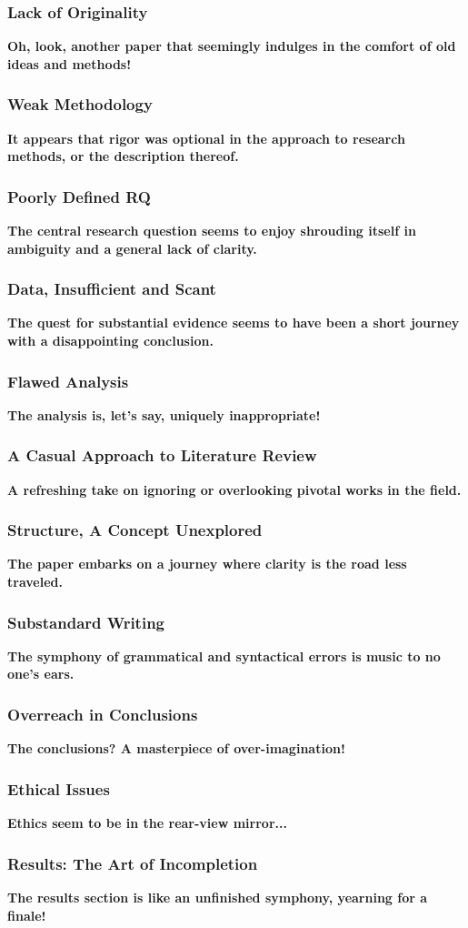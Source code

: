 \documentclass[handout]{beamer}
\begin{document}
\begin{frame}[plain]
\centering
\frametitle{Lack of Originality}
\Large\textbf{Oh, look, another paper that seemingly indulges in the comfort of old ideas and methods!}
\end{frame}
\begin{frame}[plain]
\centering
\frametitle{Weak Methodology}
\Large\textbf{It appears that rigor was optional in the approach to research methods, or the description thereof.}
\end{frame}
\begin{frame}[plain]
\centering
\frametitle{Poorly Defined RQ}
\Large\textbf{The central research question seems to enjoy shrouding itself in ambiguity and a general lack of clarity.}
\end{frame}
\begin{frame}[plain]
\centering
\frametitle{Data, Insufficient and Scant}
\Large\textbf{The quest for substantial evidence seems to have been a short journey with a disappointing conclusion.}
\end{frame}
\begin{frame}[plain]
\centering
\frametitle{Flawed Analysis}
\Large\textbf{The analysis is, let's say, uniquely inappropriate!}
\end{frame}
\begin{frame}[plain]
\centering
\frametitle{A Casual Approach to Literature Review}
\Large\textbf{A refreshing take on ignoring or overlooking pivotal works in the field.}
\end{frame}
\begin{frame}[plain]
\centering
\frametitle{Structure, A Concept Unexplored}
\Large\textbf{The paper embarks on a journey where clarity is the road less traveled.}
\end{frame}
\begin{frame}[plain]
\centering
\frametitle{Substandard Writing}
\Large\textbf{The symphony of grammatical and syntactical errors is music to no one's ears.}
\end{frame}
\begin{frame}[plain]
\centering
\frametitle{Overreach in Conclusions}
\Large\textbf{The conclusions? A masterpiece of over-imagination!}
\end{frame}
\begin{frame}[plain]
\centering
\frametitle{Ethical Issues}
\Large\textbf{Ethics seem to be in the rear-view mirror...}
\end{frame}
\begin{frame}[plain]
\centering
\frametitle{Results: The Art of Incompletion}
\Large\textbf{The results section is like an unfinished symphony, yearning for a finale!}
\end{frame}
\end{document}
